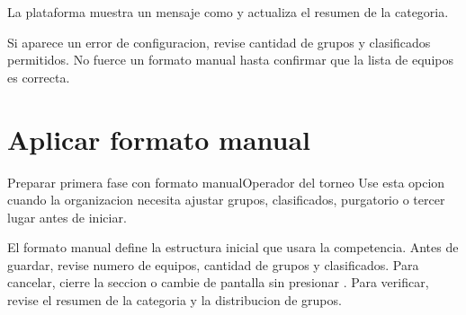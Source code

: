
\begin{resultadoesperado}
La plataforma muestra un mensaje como  y actualiza el resumen de la categoria.
\end{resultadoesperado}

\begin{fallas}
Si aparece un error de configuracion, revise cantidad de grupos y clasificados permitidos. No fuerce un formato manual hasta confirmar que la lista de equipos es correcta.
\end{fallas}

\section{Aplicar formato manual}

\begin{procedimiento}{Preparar primera fase con formato manual}{Operador del torneo}
Use esta opcion cuando la organizacion necesita ajustar grupos, clasificados, purgatorio o tercer lugar antes de iniciar.
\end{procedimiento}


\begin{operacionsensible}
El formato manual define la estructura inicial que usara la competencia. Antes de guardar, revise numero de equipos, cantidad de grupos y clasificados. Para cancelar, cierre la seccion o cambie de pantalla sin presionar . Para verificar, revise el resumen de la categoria y la distribucion de grupos.
\end{operacionsensible}

